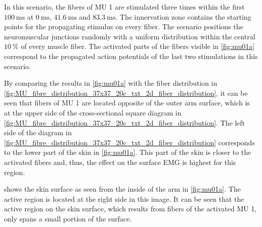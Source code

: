 In this scenario, the fibers of MU 1 are stimulated three times within the first $\SI{100}{\milli\second}$ at $\SI{0}{\milli\second}$, $\SI{41.6}{\milli\second}$ and $\SI{83.3}{\milli\second}$.  The innervation zone contains the starting points for the propagating stimulus on every fiber. The scenario positions the neuromuscular junctions randomly with a uniform distribution within the central $\SI{10}{\percent}$ of every muscle fiber. The activated parts of the fibers visible in \cref{fig:mu01a} correspond to the propagated action potentials of the last two stimulations in this scenario.

By comparing the results in \cref{fig:mu01a} with the fiber distribution in \cref{fig:MU_fibre_distribution_37x37_20c_txt_2d_fiber_distribution}, it can be seen that fibers of MU 1 are located opposite of the outer arm surface, which is at the upper side of the cross-sectional square diagram in \cref{fig:MU_fibre_distribution_37x37_20c_txt_2d_fiber_distribution}. The left side of the diagram in \cref{fig:MU_fibre_distribution_37x37_20c_txt_2d_fiber_distribution} corresponds to the lower part of the skin in \cref{fig:mu01a}. This part of the skin is closer to the activated fibers and, thus, the effect on the surface EMG is highest for this region.

 shows the skin surface as seen from the inside of the arm in \cref{fig:mu01a}. The active region is located at the right side in this image.
It can be seen that the active region on the skin surface, which results from fibers of the activated MU 1, only spans a small portion of the surface.

